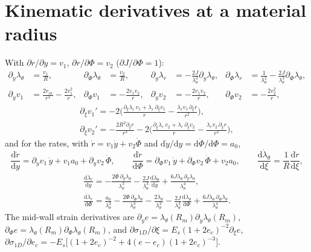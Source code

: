 \documentclass[11pt,a4paper]{article}
\newcommand{\dd}{\mathrm d}
\newcommand{\rin}{r_{in}}
\newcommand{\lt}{\lambda_\theta}
\newcommand{\lr}{\lambda_r}
\newcommand{\sig}{\sigma_{1D}}
\begin{document}
\section{Kinematic derivatives at a material radius}
\label{app:kin}
With $\partial r/\partial y=v_1$, $\partial r/\partial\Phi=v_2$ ($\partial J/\partial\Phi=1$):
\begin{align*}
\partial_y\lt&=\frac{v_1}{R}, & \partial_\Phi\lt&=\frac{v_2}{R}, &
\partial_y\lr&=-\frac{2J}{\lt^3}\partial_y\lt, & \partial_\Phi\lr&=\frac1{\lt^2}-\frac{2J}{\lt^3}\partial_\Phi\lt,\\
\partial_yv_1&=\frac{2\rin}{r^2}-\frac{2v_1^2}{r}, & \partial_\Phi v_1&=-\frac{2v_1v_2}{r}, &
\partial_yv_2&=-\frac{2v_1v_2}{r}, & \partial_\Phi v_2&=-\frac{2v_2^2}{r},
\end{align*}
\begin{gather*}
\partial_\xi v_1'=-2\Big(\frac{\partial_\xi\lr\,v_1+\lr\,\partial_\xi v_1}{r}-\frac{\lr v_1\,\partial_\xi r}{r^2}\Big),\\
\partial_\xi v_2'=-\frac{2R^2\partial_\xi r}{r^3}-2\Big(\frac{\partial_\xi\lr\,v_2+\lr\,\partial_\xi v_2}{r}-\frac{\lr v_2\,\partial_\xi r}{r^2}\Big),
\end{gather*}
and for the rates, with $\dot r=v_1\dot y+v_2\dot\Phi$ and $\dd\dot y/\dd y=\dd\dot\Phi/\dd\Phi=a_0$,
\[
\frac{\dd\dot r}{\dd y}=\partial_yv_1\,\dot y+v_1a_0+\partial_yv_2\,\dot\Phi,\qquad
\frac{\dd\dot r}{\dd\Phi}=\partial_\Phi v_1\,\dot y+\partial_\Phi v_2\,\dot\Phi+v_2a_0,\qquad
\frac{\dd\dot\lt}{\dd\xi}=\frac1R\frac{\dd\dot r}{\dd\xi},
\]
\begin{gather*}
\frac{\dd\dot\lr}{\dd y}=-\frac{2\dot\Phi\,\partial_y\lt}{\lt^3}-\frac{2J}{\lt^3}\frac{\dd\dot\lt}{\dd y}+\frac{6J\dot\lt\,\partial_y\lt}{\lt^4},\\
\frac{\dd\dot\lr}{\dd\Phi}=\frac{a_0}{\lt^2}-\frac{2\dot\Phi\,\partial_\Phi\lt}{\lt^3}-\frac{2\dot\lt}{\lt^3}-\frac{2J}{\lt^3}\frac{\dd\dot\lt}{\dd\Phi}+\frac{6J\dot\lt\,\partial_\Phi\lt}{\lt^4}.
\end{gather*}
The mid-wall strain derivatives are $\partial_ye=\lt(R_m)\partial_y\lt(R_m)$, $\partial_\Phi e=\lt(R_m)\partial_\Phi\lt(R_m)$, and
$\partial\sig/\partial\xi=E_s(1+2e_c)^{-2}\partial_\xi e$, $\partial\sig/\partial e_c=-E_s\big[(1+2e_c)^{-2}+4(e-e_c)(1+2e_c)^{-3}\big]$.
\end{document}
